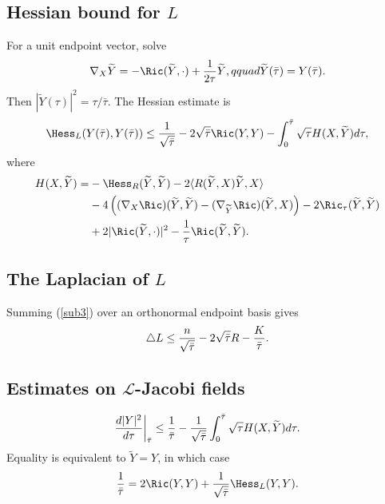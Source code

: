\subsection{Hessian bound for $L$} \label{7.9}
For a unit endpoint vector, solve
\begin{equation}\label{diffeq}\nabla_X\widetilde Y=-\Ric(\widetilde Y,\cdot)+{1\over2\tau}\widetilde Y,qquad
\widetilde Y(\bar\tau)=Y(\bar\tau).
\end{equation}
Then $|\widetilde Y(\tau)|^2=\tau/\bar\tau$. The Hessian estimate is
\begin{equation}\label{sub3}
\Hess_L(Y(\bar\tau),Y(\bar\tau))\le {1\over\sqrt{\bar\tau}}-2\sqrt{\bar\tau}\Ric(Y,Y)
-\int_0^{\bar\tau}\sqrt\tau H(X,\widetilde Y)d\tau,
\end{equation}
where
\begin{align}\label{Htilde}
H(X,\widetilde Y)=&-\Hess_R(\widetilde Y,\widetilde Y)-2\langle R(\widetilde Y,X)\widetilde Y,X\rangle\\
&-4\left((\nabla_X\Ric)(\widetilde Y,\widetilde Y)-(\nabla_{\widetilde Y}\Ric)(\widetilde Y,X)\right)-2\Ric_\tau(\widetilde Y,\widetilde Y)\\
&+2|\Ric(\widetilde Y,\cdot)|^2-{1\over\tau}\Ric(\widetilde Y,\widetilde Y).
\end{align}

\subsection{The Laplacian of $L$} \label{7.10}
Summing (\ref{sub3}) over an orthonormal endpoint basis gives
\begin{equation}\label{touse2}
\triangle L\le {n\over\sqrt{\bar\tau}}-2\sqrt{\bar\tau}R-{K\over\bar\tau}.
\end{equation}

\subsection{Estimates on ${\mathcal L}$-Jacobi fields}
\begin{equation}\label{dY}
{d|Y|^2\over d\tau}\bigg|_{\bar\tau}\le {1\over\bar\tau}-{1\over\sqrt{\bar\tau}}\int_0^{\bar\tau}\sqrt\tau H(X,\widetilde Y)d\tau.
\end{equation}
Equality is equivalent to $\widetilde Y=Y$, in which case
\begin{equation}\label{sharp}{1\over\bar\tau}=2\Ric(Y,Y)+{1\over\sqrt{\bar\tau}}\Hess_L(Y,Y).
\end{equation}

